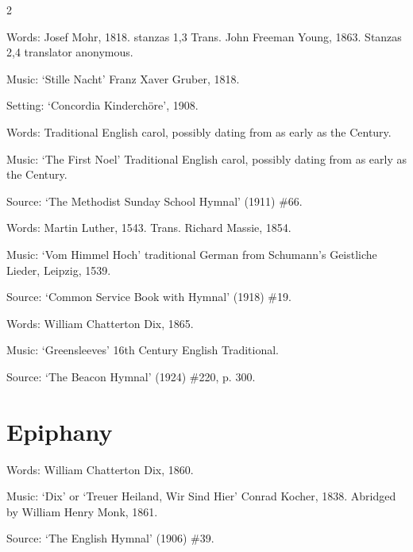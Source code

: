 \begin{multicols}{2}
\par\noindent
Words: Josef Mohr, 1818. stanzas 1,3 Trans. John Freeman Young, 1863. Stanzas 2,4 translator anonymous.
\par\noindent
Music: `Stille Nacht' Franz Xaver Gruber, 1818.
\par\noindent
Setting: `Concordia Kinderchöre', 1908.


\par\noindent
Words: Traditional English carol, possibly dating from as early as the  Century.
\par\noindent
Music: `The First Noel' Traditional English carol, possibly dating from as early as the  Century.
\par\noindent
Source: `The Methodist Sunday School Hymnal' (1911) \#66.


\par\noindent
Words: Martin Luther, 1543. Trans. Richard Massie, 1854. 
\par\noindent
Music: `Vom Himmel Hoch' traditional German from Schumann's Geistliche Lieder, Leipzig, 1539.
\par\noindent
Source: `Common Service Book with Hymnal' (1918) \#19.


\par\noindent
Words: William Chatterton Dix, 1865. 
\par\noindent
Music: `Greensleeves' 16th Century English Traditional.
\par\noindent
Source: `The Beacon Hymnal' (1924) \#220, ‎p. 300.


\section*{Epiphany}
\par\noindent
Words: William Chatterton Dix, 1860. 
\par\noindent
Music: `Dix' or `Treuer Heiland, Wir Sind Hier' Conrad Kocher, 1838. Abridged by William Henry Monk, 1861.
\par\noindent
Source: `The English Hymnal' (1906) \#39.%



\end{multicols}
